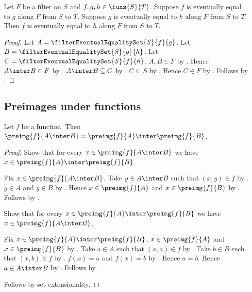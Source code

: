 \begin{proposition}\label{filter_eventually_equal_transitive}
    Let $F$ be a filter on $S$ and $f,g,h\in\funs{S}{T}$.
    Suppose $f$ is eventually equal to $g$ along $F$ from $S$ to $T$.
    Suppose $g$ is eventually equal to $h$ along $F$ from $S$ to $T$.
    Then $f$ is eventually equal to $h$ along $F$ from $S$ to $T$.
\end{proposition}
\begin{proof}
    Let $A=\filterEventualEqualitySet{S}{f}{g}$.
    Let $B=\filterEventualEqualitySet{S}{g}{h}$.
    Let $C=\filterEventualEqualitySet{S}{f}{h}$.
    $A,B\in F$ by .
    Hence $A\inter B\in F$ by .
    $A\inter B\subseteq C$ by
        .
    $C\subseteq S$ by
        .
    Hence $C\in F$ by .
    Follows by .
\end{proof}

\subsection{Preimages under functions}

\begin{proposition}\label{function_preimage_intersection}
    Let $f$ be a function.
    Then $\preimg{f}{A\inter B}
        =\preimg{f}{A}\inter\preimg{f}{B}$.
\end{proposition}
\begin{proof}
    Show that for every $x\in\preimg{f}{A\inter B}$ we have
        $x\in\preimg{f}{A}\inter\preimg{f}{B}$.
    \begin{subproof}
        Fix $x\in\preimg{f}{A\inter B}$.
        Take $y\in A\inter B$ such that $(x,y)\in f$ by
            .
        $y\in A$ and $y\in B$ by .
        Hence $x\in\preimg{f}{A}$ and $x\in\preimg{f}{B}$ by
            .
        Follows by .
    \end{subproof}
    Show that for every $x\in\preimg{f}{A}\inter\preimg{f}{B}$ we have
        $x\in\preimg{f}{A\inter B}$.
    \begin{subproof}
        Fix $x\in\preimg{f}{A}\inter\preimg{f}{B}$.
        $x\in\preimg{f}{A}$ and $x\in\preimg{f}{B}$ by .
        Take $a\in A$ such that $(x,a)\in f$ by .
        Take $b\in B$ such that $(x,b)\in f$ by .
        $f(x)=a$ and $f(x)=b$ by .
        Hence $a=b$.
        Hence $a\in A\inter B$ by .
        Follows by .
    \end{subproof}
    Follows by set extensionality.
\end{proof}

